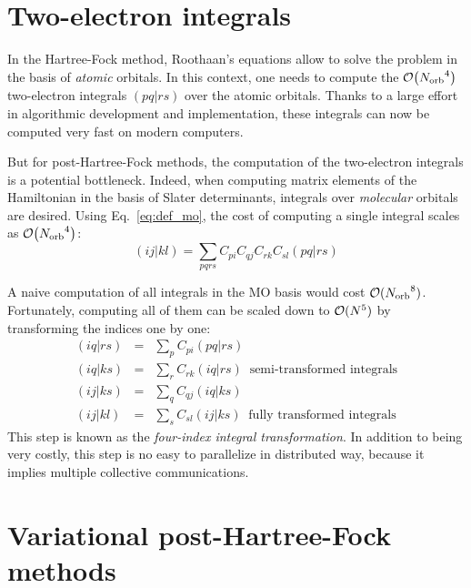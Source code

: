 \documentclass[./thesis.tex]{subfiles}
\begin{document}
\section{Two-electron integrals}

In the Hartree-Fock method, Roothaan's equations allow to solve the problem in the basis of 
\emph{atomic} orbitals.\cite{Roothaan_1951}
In this context, one needs to compute the $\order{\Norb^4}$ two-electron integrals $(pq|rs)$ over the
atomic orbitals. Thanks to a large effort in algorithmic development and
implementation,\cite{Obara_1986,Head_Gordon_1988,Ten_no_1993,Gill_1989,Gill_1991,Libint2,Zhang_2018}
these integrals can now be computed very fast on modern computers.

But for post-Hartree-Fock methods, the computation of the two-electron
integrals is a potential bottleneck.
Indeed, when computing matrix elements of the Hamiltonian in the basis of
Slater determinants, integrals over \emph{molecular} orbitals are desired. Using
Eq.~\eqref{eq:def_mo},
the cost of computing a single integral scales as $\order{\Norb^4}$:
\begin{equation}
(ij|kl) = \sum_{pqrs} C_{pi} C_{qj} C_{rk} C_{sl} (pq|rs)
\end{equation}

A naive computation of all integrals in the MO basis would cost ${\cal O}({N_\text{orb}}^8)$. Fortunately, computing all of them can be scaled down to ${\cal O}(N^5)$ by transforming the indices one by one:\cite{Wilson_1987}
\begin{eqnarray}
(iq\vert rs) & = & \sum_{p} C_{pi} (pq|rs) \nonumber \\ 
(iq\vert ks) & = & \sum_{r} C_{rk} (iq|rs) \;\; \text{semi-transformed integrals} \\
(ij\vert ks) & = & \sum_{q} C_{qj} (iq|ks) \nonumber \\ 
(ij\vert kl) & = & \sum_{s} C_{sl} (ij|ks)  \;\; \text{fully transformed integrals}
\end{eqnarray}
This step is known as the \emph{four-index integral transformation}.  
In addition to being very costly, this step is no easy to parallelize in
distributed way, because it implies multiple collective communications.\cite{Rajbhandari_2017,Limaye_1994,Fletcher_1999,Covick_1990}



\section{Variational post-Hartree-Fock methods}
\end{document}
